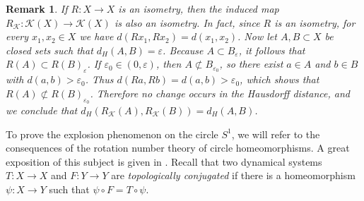 \documentclass[sn-mathphys-num]{sn-jnl}%
\theoremstyle{thmstyleone}%
\theoremstyle{thmstyletwo}%
\newtheorem{remark}{Remark}%
\theoremstyle{thmstylethree}%
\newcommand*\induce[1]{#1_\mathcal{K}}
\newcommand*\hyp[1]{\mathcal{#1}}
\begin{document}
\begin{remark}\label{prop:isometry-hyp}
    If $R: X \to X$ is an isometry, then the induced map $\induce{R}: \hyp{K}(X) \to \hyp{K}(X)$ is also an isometry. In fact, since $R$ is an isometry, for every $x_1, x_2 \in X$ we have $d(Rx_1, Rx_2) = d(x_1, x_2)$. Now let $A,B \subset X$ be closed sets such that $d_H(A,B) = \varepsilon$. Because $A \subset B_\varepsilon$, it follows that $R(A) \subset R(B)_\varepsilon$. If $\varepsilon_0 \in (0,\varepsilon)$, then $A \not\subset B_{\varepsilon_0}$, so there exist $a \in A$ and $b \in B$ with $d(a,b) > \varepsilon_0$. Thus $d(Ra,Rb) = d(a,b) > \varepsilon_0$, which shows that $R(A) \not\subset R(B)_{\varepsilon_0}$. Therefore no change occurs in the Hausdorff distance, and we conclude that  $d_H(\induce{R}(A),\induce{R}(B)) = d_H(A,B)$.\\
\end{remark}

To prove the explosion phenomenon on the circle $S^1$, we will refer to the consequences of the rotation number theory of circle homeomorphisms. A great exposition of this subject is given in \cite{defaria_guarino_2022}. Recall that two dynamical systems $T: X \to X$ and $F: Y \to Y$ are \textit{topologically conjugated} if there is a homeomorphism $\psi: X \to Y$ such that $\psi\circ F = T\circ \psi$.
\end{document}
